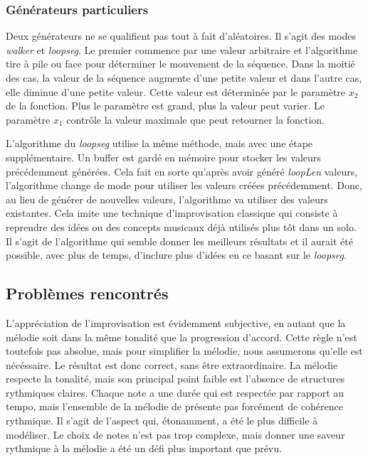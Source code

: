 \documentclass[letterpaper,12pt]{scrartcl}
\begin{document}
	\subsubsection{Générateurs particuliers}
	Deux générateurs ne se qualifient pas tout à fait d'aléatoires. Il s'agit des modes \textit{walker} et \textit{loopseg}. Le premier commence par une valeur arbitraire et l'algorithme tire à pile ou face pour déterminer le mouvement de la séquence. Dans la moitié des cas, la valeur de la séquence augmente d'une petite valeur et dans l'autre cas, elle diminue d'une petite valeur. Cette valeur est déterminée par le paramètre $x_2$ de la fonction. Plus le paramètre est grand, plus la valeur peut varier. Le paramètre $x_1$ contrôle la valeur maximale que peut retourner la fonction.
	
	L'algorithme du \textit{loopseg} utilise la même méthode, mais avec une étape supplémentaire. Un buffer est gardé en mémoire pour stocker les valeurs précédemment générées. Cela fait en sorte qu'après avoir généré \textit{loopLen} valeurs, l'algorithme change de mode pour utiliser  les valeurs créées précédemment. Donc, au lieu de générer de nouvelles valeurs, l'algorithme va utiliser des valeurs existantes. Cela imite une technique d'improvisation classique qui consiste à reprendre des idées ou des concepts musicaux déjà utilisés plus tôt dans un solo. Il s'agit de l'algorithme qui semble donner les meilleurs résultats et il aurait été possible, avec plus de temps, d'inclure plus d'idées en ce basant sur le \textit{loopseg}.
	
	\subsection{Problèmes rencontrés}
	L'appréciation de l'improvisation est évidemment subjective, en autant que la mélodie soit dans la même tonalité que la progression d'accord. Cette règle n'est toutefois pas absolue, mais pour simplifier la mélodie, nous assumerons qu'elle est nécéssaire. Le résultat est donc correct, sans être extraordinaire. La mélodie respecte la tonalité, mais son principal point faible est l'absence de structures rythmiques claires. Chaque note a une durée qui est respectée par rapport au tempo, mais l'ensemble de la mélodie de présente pas forcément de cohérence rythmique. Il s'agit de l'aspect qui, étonamment, a été le plus difficile à modéliser. Le choix de notes n'est pas trop complexe, mais donner une saveur rythmique à la mélodie a été un défi plus important que prévu. 
	
\end{document}
